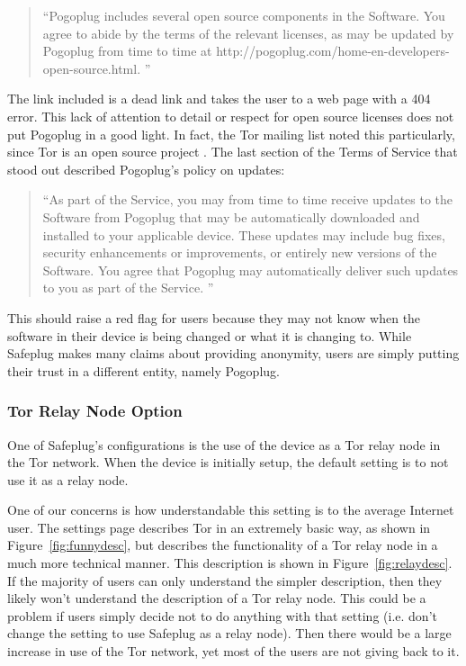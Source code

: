 \begin{quotation}
``Pogoplug includes several open source components in the Software. You agree to abide by the terms of the relevant licenses, as may be updated by Pogoplug from time to time at http://pogoplug.com/home-en-developers-open-source.html. '' \cite{safeplug}
\end{quotation}

The link included is a dead link and takes the user to a web page with a 404 error.  This lack of attention to detail or respect for open source licenses does not put Pogoplug in a good light.  In fact, the Tor mailing list noted this particularly, since Tor is an open source project \cite{tormailinglist}.  The last section of the Terms of Service that stood out described Pogoplug's policy on updates:

\begin{quotation}
``As part of the Service, you may from time to time receive updates to the Software from Pogoplug that may be automatically downloaded and installed to your applicable device. These updates may include bug fixes, security enhancements or improvements, or entirely new versions of the Software. You agree that Pogoplug may automatically deliver such updates to you as part of the Service. '' \cite{safeplug}
\end{quotation}

This should raise a red flag for users because they may not know when the software in their device is being changed or what it is changing to.  While Safeplug makes many claims about providing anonymity, users are simply putting their trust in a different entity, namely Pogoplug.

\subsubsection{Tor Relay Node Option}
One of Safeplug's configurations is the use of the device as a Tor relay node in the Tor network.  When the device is initially setup, the default setting is to not use it as a relay node.  

One of our concerns is how understandable this setting is to the average Internet user.  The settings page describes Tor in an extremely basic way, as shown in Figure~\ref{fig:funnydesc}, but describes the functionality of a Tor relay node in a much more technical manner.  This description is shown in Figure~\ref{fig:relaydesc}.  If the majority of users can only understand the simpler description, then they likely won't understand the description of a Tor relay node.  This could be a problem if users simply decide not to do anything with that setting (i.e. don't change the setting to use Safeplug as a relay node).  Then there would be a large increase in use of the Tor network, yet most of the users are not giving back to it.

